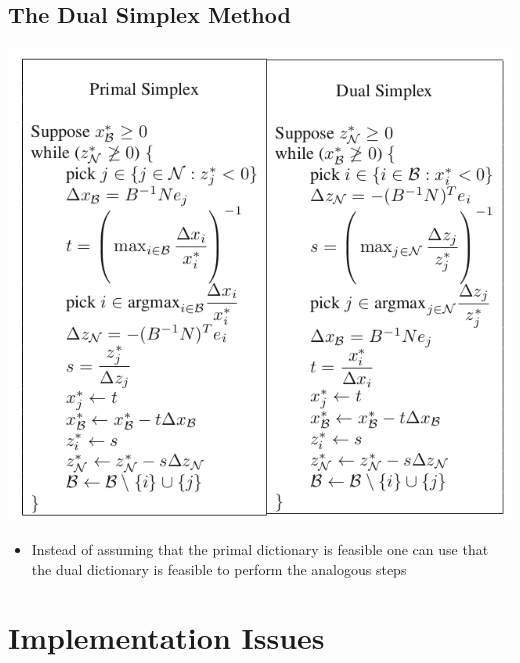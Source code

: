 \documentclass[11pt]{article}
\begin{document}
\subsection{The Dual Simplex Method}
\label{sec:org586cd05}
\begin{center}
\includegraphics[width=.9\linewidth]{The Simplex Method in Matrix Notation/screenshot_2019-02-11_17-52-35.png}
\end{center}

\begin{itemize}
\item Instead of assuming that the primal dictionary is feasible one can use that the dual dictionary is feasible to perform the analogous steps
\end{itemize}

\section{Implementation Issues}
\label{sec:orgfe2bbfd}
\end{document}
